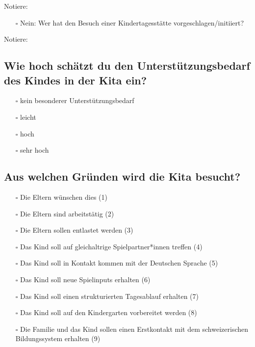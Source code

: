 \documentclass[
  ngerman,
  11pt,
  paper=a4,
  twoside,
  titlepage=true,
  openright,
  abstract=on,
  toc=listofnumbered,
  numbers=noenddot,
  chapterprefix=true,
  headings=optiontohead,
  svgnames,
  dvipsnames]{scrreprt}
\providecommand{\tightlist}{%
  \setlength{\itemsep}{0pt}\setlength{\parskip}{0pt}}
\begin{document}
Notiere: \xhrulefill[,fill=8cm,thickness=0.5pt]

\begin{itemize}
\tightlist
\item[$\square$]
  Nein: Wer hat den Besuch einer Kindertagesstätte
  vorgeschlagen/initiiert?
\end{itemize}

Notiere: \xhrulefill[,fill=8cm,thickness=0.5pt]

\hypertarget{wie-hoch-schuxe4tzt-du-den-unterstuxfctzungsbedarf-des-kindes-in-der-kita-ein-1}{%
\subsection*{Wie hoch schätzt du den Unterstützungsbedarf des Kindes in
der Kita
ein?}\label{wie-hoch-schuxe4tzt-du-den-unterstuxfctzungsbedarf-des-kindes-in-der-kita-ein-1}}

\begin{itemize}
\tightlist
\item[$\square$]
  kein besonderer Unterstützungsbedarf
\item[$\square$]
  leicht
\item[$\square$]
  hoch
\item[$\square$]
  sehr hoch
\end{itemize}

\hypertarget{aus-welchen-gruxfcnden-wird-die-kita-besucht}{%
\subsection*{Aus welchen Gründen wird die Kita
besucht?}\label{aus-welchen-gruxfcnden-wird-die-kita-besucht}}

\begin{itemize}
\tightlist
\item[$\square$]
  Die Eltern wünschen dies (1)
\item[$\square$]
  Die Eltern sind arbeitstätig (2)
\item[$\square$]
  Die Eltern sollen entlastet werden (3)
\item[$\square$]
  Das Kind soll auf gleichaltrige Spielpartner*innen treffen (4)
\item[$\square$]
  Das Kind soll in Kontakt kommen mit der Deutschen Sprache (5)
\item[$\square$]
  Das Kind soll neue Spielinputs erhalten (6)
\item[$\square$]
  Das Kind soll einen strukturierten Tagesablauf erhalten (7)
\item[$\square$]
  Das Kind soll auf den Kindergarten vorbereitet werden (8)
\item[$\square$]
  Die Familie und das Kind sollen einen Erstkontakt mit dem
  schweizerischen Bildungssystem erhalten (9)
\end{itemize}
\end{document}

